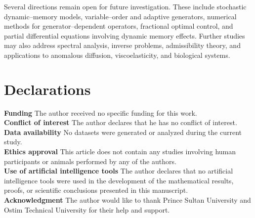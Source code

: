 \documentclass[11pt]{article}
\numberwithin{equation}{section}
\begin{document}
Several directions remain open for future investigation. These include stochastic dynamic--memory models, variable--order and adaptive generators, numerical methods for generator--dependent operators, fractional optimal control, and partial differential equations involving dynamic memory effects. Further studies may also address spectral analysis, inverse problems, admissibility theory, and applications to anomalous diffusion, viscoelasticity, and biological systems.

\section*{Declarations}

\textbf{Funding}
The author received no specific funding for this work.\\
\textbf{Conflict of interest}
The author declares that he has no conflict of interest.\\
\textbf{Data availability}
No datasets were generated or analyzed during the current study.\\
\textbf{Ethics approval}
This article does not contain any studies involving human participants or animals performed by any of the authors.\\
\textbf{Use of artificial intelligence tools}
The author declares that no artificial intelligence tools were used in the development of the mathematical results, proofs, or scientific conclusions presented in this manuscript. 
\\
\textbf{Acknowledgment} The author would like to thank Prince Sultan University and Ostim Technical University for their help and support.
\end{document}
